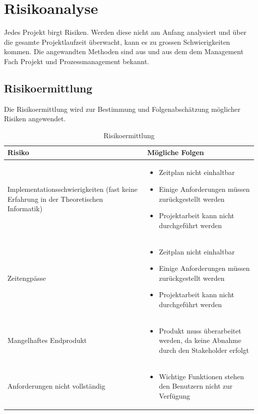 \section{Risikoanalyse}\label{risikoanalyse}
Jedes Projekt birgt Risiken. Werden diese nicht am Anfang analysiert und über die gesamte Projektlaufzeit überwacht, kann es zu grossen Schwierigkeiten kommen. Die angewandten Methoden sind aus \cite{proj_mgmt_book} und aus dem dem Management Fach Projekt und Prozessmanagement bekannt.

\subsection{Risikoermittlung}\label{risikoermittlung}
Die Risikoermittlung wird zur Bestimmung und Folgenabschätzung möglicher Risiken angewendet.

\begin{table}[ht]
\centering
  \begin{tabular}{  p{5cm} | p{9cm} }
	\hline
	\rowcolor{gray}
	\textbf{Risiko}					&	\textbf{Mögliche Folgen}	\\ \hline
	Implementationsschwierigkeiten (fast keine Erfahrung in der Theoretischen Informatik)
								&	\begin{itemize}
										\item Zeitplan nicht einhaltbar
										\item Einige Anforderungen müssen zurückgestellt werden
										\item Projektarbeit kann nicht durchgeführt werden
									\end{itemize}	\\ \hline
	Zeitengpässe
								&	\begin{itemize}
										\item Zeitplan nicht einhaltbar
										\item Einige Anforderungen müssen zurückgestellt werden
										\item Projektarbeit kann nicht durchgeführt werden
									\end{itemize}	\\ \hline
	Mangelhaftes Endprodukt		
								&	\begin{itemize}
										\item Produkt muss überarbeitet werden, da keine Abnahme durch den Stakeholder erfolgt
									\end{itemize}	\\ \hline	
	Anforderungen nicht vollständig	
								&	\begin{itemize}
										\item Wichtige Funktionen stehen den Benutzern nicht zur Verfügung
									\end{itemize}	\\ \hline			
  \end{tabular}
   \caption{Risikoermittlung}
\end{table}

